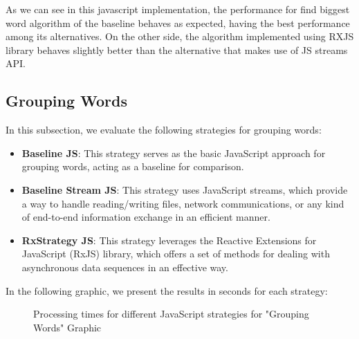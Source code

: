 As we can see in this javascript implementation, the performance for find biggest word algorithm of the baseline behaves as expected, having the best performance among its alternatives. On the other side, the algorithm implemented using RXJS library behaves slightly better than the alternative that makes use of JS streams API.


\clearpage



\subsection{Grouping Words}
\label{subsec:grouping_words_js}

In this subsection, we evaluate the following strategies for grouping words:

\begin{itemize}
    \item \textbf{Baseline JS}: This strategy serves as the basic JavaScript approach for grouping words, acting as a baseline for comparison.
    \item \textbf{Baseline Stream JS}: This strategy uses JavaScript streams, which provide a way to handle reading/writing files, network communications, or any kind of end-to-end information exchange in an efficient manner.
    \item \textbf{RxStrategy JS}: This strategy leverages the Reactive Extensions for JavaScript (RxJS) library, which offers a set of methods for dealing with asynchronous data sequences in an effective way.
\end{itemize}

In the following graphic, we present the results in seconds for each strategy:


\begin{figure}[H]
    \centering
    \caption{Processing times for different JavaScript strategies for "Grouping Words" Graphic}
    \label{fig:grouping_words_processing_times_js}
\end{figure}




